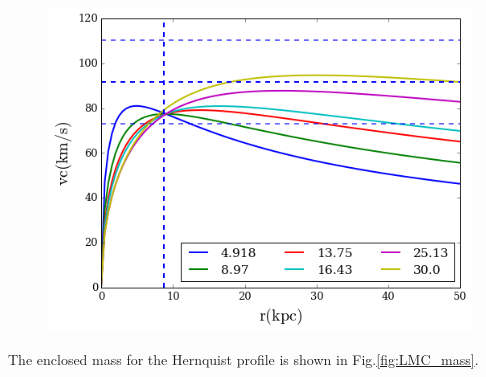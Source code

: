 \begin{figure}[H]{\label{fig:LMC_rotcurve}}
\centering
\includegraphics[scale=0.4]{LMC_rotcurve_hernquist.png}
\end{figure}


The enclosed mass for the Hernquist profile is shown in Fig.\ref{fig:LMC_mass}.

